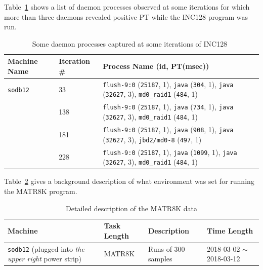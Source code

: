Table~\ref{tab:daemon2} shows a list of daemon processes observed at some iterations for which more than three daemons revealed positive PT while the INC128 program was run.
\begin{table}[htp!]
\centering
{
 \begin{tabular}{|p{1.5cm}|p{2cm}|p{12.5cm}|} \hline
Machine Name & Iteration \# & Process Name (id, PT(msec))\\ \hline
 {\tt sodb12}  & 33 & {\tt flush-9:0} ({\tt 25187}, 1), {\tt java} ({\tt 304}, 1), {\tt java} ({\tt 32627}, 3), {\tt md0\_raid1} ({\tt 484}, 1) \\ \cline{2-3}
					  & 138  & {\tt flush-9:0} ({\tt 25187}, 1), {\tt java} ({\tt 734}, 1), {\tt java} ({\tt 32627}, 3), {\tt md0\_raid1} ({\tt 484}, 1)  \\ \cline{2-3}
					  & 181 & {\tt flush-9:0} ({\tt 25187}, 1), {\tt java} ({\tt 908}, 1), {\tt java} ({\tt 32627}, 3), {\tt jbd2/md0-8} ({\tt 497}, 1) \\ \cline{2-3}
				     & 228 &  {\tt flush-9:0} ({\tt 25187}, 1), {\tt java} ({\tt 1099}, 1), {\tt java} ({\tt 32627}, 3), {\tt md0\_raid1} ({\tt 484}, 1)\\ \cline{2-3}
 \hline
 \end{tabular}
  }
 \caption{Some daemon processes captured at some iterations of INC128~\label{tab:daemon2}}
\end{table}

Table~\ref{tab:exp_notes6} gives a background description of what environment 
was set for running the MATR8K program.

\begin{table}[h]
\begin{center}
\begin{tabular}{|p{4cm}|p{3cm}|p{4cm}|p{4cm}|} \hline
Machine & Task Length & Description & Time Length\\ \hline
{\tt sodb12} (plugged into {\em the upper right} power strip) & MATR8K& Runs of 300 samples & 2018-03-02 $\sim$2018-03-12 \\ \hline
\end{tabular}
\end{center}
\vspace{-.2in}
\caption{Detailed description of the MATR8K data\label{tab:exp_notes6}}
\end{table}


